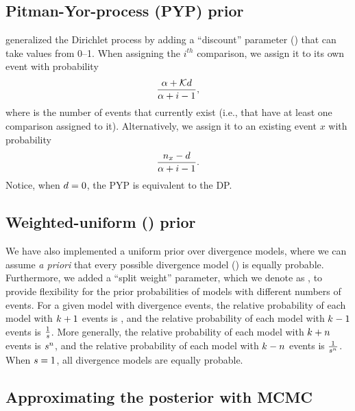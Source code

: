 \documentclass[letterpaper,12pt]{article}
\begin{document}
\subsection{Pitman-Yor-process (PYP) prior}

\begin{linenomath}
\citet{PitmanYor1997} generalized the Dirichlet process by adding a
``discount'' parameter (\discount) that can take values from 0--1.
When assigning the $i^{th}$ comparison, we assign it to its own event
with probability
\begin{equation}
    \frac{\alpha + \mathcal{K} d}{\alpha + i - 1},
    \label{eq:pypnewcat}
\end{equation}
where \nexistingcats is the number of events that currently exist (i.e., that have at
least one comparison assigned to it).
Alternatively, we assign it to an existing event $x$ with probability
\begin{equation}
    \frac{n_x - d}{\alpha + i -1}.
    \label{eq:pypexistingcat}
\end{equation}
Notice, when $d = 0$, the PYP is equivalent to the DP.
\end{linenomath}

\subsection{Weighted-uniform (\wunif) prior}
We have also implemented a uniform prior over divergence models, where we can
assume \emph{a priori} that every possible divergence model (\etimesets) is
equally probable.
Furthermore, we added a ``split weight'' parameter, which we denote as
\splitweight, to provide flexibility for the prior probabilities of
models with different numbers of events.
For a given model with \nevents divergence events, the relative probability
of each model with $k_{} + 1$ events is \splitweight,
and the relative probability of each model with $k_{} - 1$ events is
$\frac{1}{s}$.
More generally, the relative probability of each model with
$k_{} + n$
events is
$s{}^n$,
and the relative probability of each model with
$k_{} - n$
events is
$\frac{1}{s{}^n}$.
When $s = 1$, all divergence models are equally probable.

\subsection{Approximating the posterior with MCMC}
\end{document}
